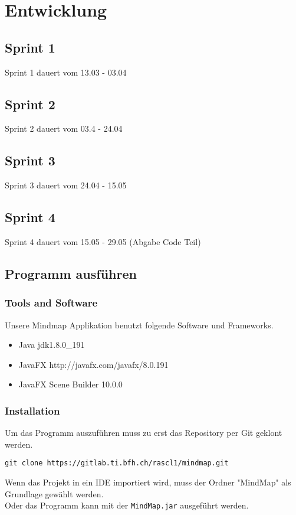 \chapter{Entwicklung}
\label{chap:entwicklung}

\section{Sprint 1}
\label{sec:sprint_1}
Sprint 1 dauert vom 13.03 - 03.04
\section{Sprint 2}
\label{sec:sprint_2}
Sprint 2 dauert vom 03.4 - 24.04
\section{Sprint 3}
\label{sec:sprint_3}
Sprint 3 dauert vom 24.04 - 15.05
\section{Sprint 4}
\label{sec:sprint_4}
Sprint 4 dauert vom 15.05 - 29.05 (Abgabe Code Teil)

\section{Programm ausführen}
\label{sec:run_program}

\subsection{Tools and Software}
\label{subsec:tools}
Unsere Mindmap Applikation benutzt folgende Software und Frameworks.
\begin{itemize}
\item Java jdk1.8.0\_{}191
\item JavaFX http://javafx.com/javafx/8.0.191
\item JavaFX Scene Builder 10.0.0
\end{itemize}

\subsection{Installation}
Um das Programm auszuführen muss zu erst das Repository per Git geklont werden.
\begin{verbatim}
git clone https://gitlab.ti.bfh.ch/rascl1/mindmap.git
\end{verbatim}
Wenn das Projekt in ein IDE importiert wird, muss der Ordner "{}MindMap"{} als Grundlage gewählt werden.\\
Oder das Programm kann mit der \texttt{MindMap.jar} ausgeführt werden.